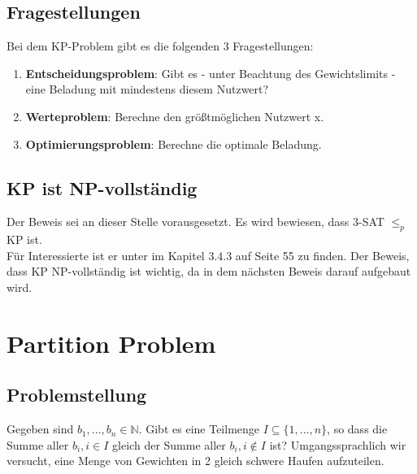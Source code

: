\documentclass[ngerman]{article}
\begin{document}
\subsection{Fragestellungen}
Bei dem KP-Problem gibt es die folgenden 3 Fragestellungen:
\begin{enumerate}
\item \textbf{Entscheidungsproblem}: Gibt es - unter Beachtung des Gewichtslimits - eine Beladung mit mindestens diesem Nutzwert?\\
\item \textbf{Werteproblem}: Berechne den größtmöglichen Nutzwert x.\\
\item \textbf{Optimierungsproblem}: Berechne die optimale Beladung.\\
\end{enumerate}

\subsection{KP ist NP-vollständig}
\label{sec:BeweisKP}
Der Beweis sei an dieser Stelle vorausgesetzt.
Es wird bewiesen, dass 3-SAT \(\le_p\) KP ist.\\
Für Interessierte ist er unter \cite{wegener} im Kapitel 3.4.3 auf Seite 55 zu finden.
Der Beweis, dass KP NP-vollständig ist wichtig, da in dem nächsten Beweis darauf aufgebaut wird.

\section{Partition Problem}
\subsection{Problemstellung}
Gegeben sind \(b_1,...,b_n \in \mathbb{N}\). Gibt es eine Teilmenge \(I \subseteq \{1,...,n\}\), so dass die Summe aller \(b_i, i \in I\) gleich der Summe aller \(b_i, i \notin I\) ist?
Umgangssprachlich wir versucht, eine Menge von Gewichten in 2 gleich schwere Haufen aufzuteilen.
\end{document}
